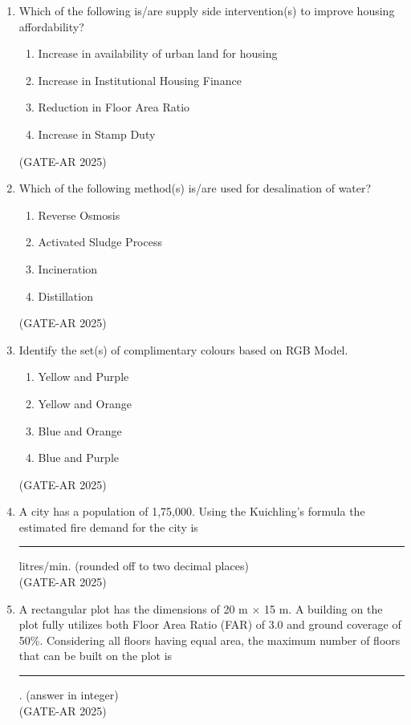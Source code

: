 \documentclass[a4paper,10pt]{article}
\begin{document}
\begin{enumerate}
\item Which of the following is/are supply side intervention(s) to improve housing affordability?
\begin{enumerate}
    \item Increase in availability of urban land for housing
    \item Increase in Institutional Housing Finance
    \item Reduction in Floor Area Ratio
    \item Increase in Stamp Duty
\end{enumerate}
\hfill (GATE-AR 2025)

\item Which of the following method(s) is/are used for desalination of water?
\begin{multicols}{2}
\begin{enumerate}
    \item Reverse Osmosis
    \item Activated Sludge Process
    \item Incineration
    \item Distillation
\end{enumerate}
\end{multicols}
\hfill (GATE-AR 2025)

\item Identify the set(s) of complimentary colours based on RGB Model.
\begin{enumerate}
    \item Yellow and Purple
    \item Yellow and Orange
    \item Blue and Orange
    \item Blue and Purple
\end{enumerate}
\hfill (GATE-AR 2025)

    \item A city has a population of 1,75,000. Using the Kuichling's formula the estimated fire demand for the city is \rule{2cm}{0.4pt} litres/min. (rounded off to two decimal places) \\
    \hfill (GATE-AR 2025)

    \item A rectangular plot has the dimensions of 20 m $\times$ 15 m. A building on the plot fully utilizes both Floor Area Ratio (FAR) of 3.0 and ground coverage of 50\%. Considering all floors having equal area, the maximum number of floors that can be built on the plot is \rule{2cm}{0.4pt}. (answer in integer) \\
    \hfill (GATE-AR 2025)


\end{enumerate}
\end{document}
